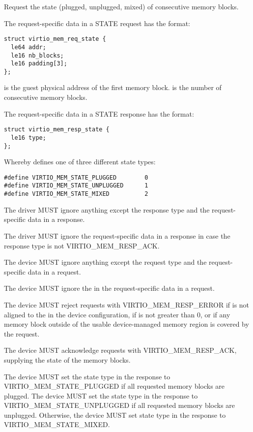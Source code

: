 Request the state (plugged, unplugged, mixed) of consecutive memory blocks.

The request-specific data in a STATE request has the format:

\begin{lstlisting}
struct virtio_mem_req_state {
  le64 addr;
  le16 nb_blocks;
  le16 padding[3];
};
\end{lstlisting}

 is the guest physical address of the first memory block.
 is the number of consecutive memory blocks.

The request-specific data in a STATE response has the format:

\begin{lstlisting}
struct virtio_mem_resp_state {
  le16 type;
};
\end{lstlisting}

Whereby  defines one of three different state types:

\begin{lstlisting}
#define VIRTIO_MEM_STATE_PLUGGED        0
#define VIRTIO_MEM_STATE_UNPLUGGED      1
#define VIRTIO_MEM_STATE_MIXED          2
\end{lstlisting}


The driver MUST ignore anything except the response type and the
request-specific data in a response.

The driver MUST ignore the request-specific data in a response in case the
response type is not VIRTIO_MEM_RESP_ACK.


The device MUST ignore anything except the request type and the
request-specific data in a request.

The device MUST ignore the  in the request-specific data in
a request.

The device MUST reject requests with VIRTIO_MEM_RESP_ERROR if 
is not aligned to the  in the device configuration, if
 is not greater than 0, or if any memory block outside of
the usable device-managed memory region is covered by the request.

The device MUST acknowledge requests with VIRTIO_MEM_RESP_ACK, supplying
the state of the memory blocks.

The device MUST set the state type in the response to
VIRTIO_MEM_STATE_PLUGGED if all requested memory blocks are plugged.  The
device MUST set the state type in the response to
VIRTIO_MEM_STATE_UNPLUGGED if all requested memory blocks are unplugged.
Otherwise, the device MUST set state type in the response to
VIRTIO_MEM_STATE_MIXED.
